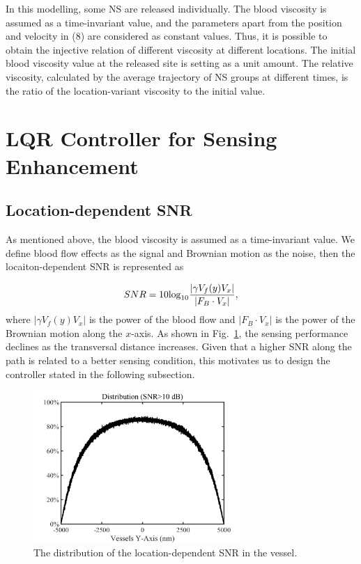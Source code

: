 \documentclass[conference]{IEEEtran}
\begin{document}
In this modelling, some NS are released individually. The blood viscosity is assumed as a time-invariant value, and the parameters apart from the position and velocity in (8) are considered as constant values. Thus, it is possible to obtain the injective relation of different viscosity at different locations. The initial blood viscosity value at the released site is setting as a unit amount.  The relative viscosity, calculated by the average trajectory of NS groups  at different times, is the ratio of the location-variant viscosity to the initial value.

 
\section {LQR Controller for Sensing Enhancement}

\subsection {Location-dependent SNR}

As mentioned above, the blood viscosity is assumed as a time-invariant value. We define blood flow effects as the signal and Brownian motion as the noise, then the locaiton-dependent SNR is represented as 

\begin{equation}
  SNR = 10 {\rm log}_{10} {\frac{\vert \gamma V_f(y) V_x \vert}{\vert F_B \cdot V_x \vert} },
\label{eq7}
\end{equation}
where $\vert \gamma V_f(y) V_x \vert$ is the power of the blood flow and $\vert F_B \cdot V_x \vert $ is the power of the Brownian motion along the $x$-axis. As shown in Fig.~\ref{fig_SNR}, the sensing performance declines as the transversal distance increases. Given that a higher SNR along the path is related to a better sensing condition, this motivates us to design the controller stated in the following subsection.

\begin{figure}
\centering
\captionsetup{singlelinecheck=off}
\includegraphics[width=8cm]{fig_SNR.png}
\caption{The distribution of the location-dependent SNR in the vessel.}
\label{fig_SNR}
\end{figure}
\end{document}
